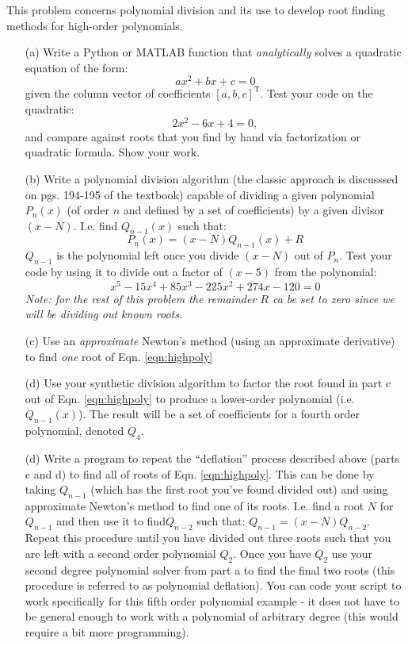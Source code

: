\documentclass{article}
\begin{document}
\begin{enumerate}
  This problem concerns polynomial division and its use to develop root finding methods for high-order polynomials.  
  \begin{itemize}
    \item[(a)]  Write a Python or MATLAB function that \emph{analytically} solves a quadratic equation of the form:
    \begin{equation}
      a x^2 + b x + c = 0 
    \end{equation}
    given the column vector of coefficients $[a, b, c]^\mathsf{T}$.  Test your code on the quadratic:
    \begin{equation}
      2x^2-6x+4=0,
    \end{equation}
    and compare against roots that you find by hand via factorization or quadratic formula.  Show your work.  
    \item[(b)]  Write a polynomial division algorithm (the classic approach is discusssed on pgs. 194-195 of the textbook) capable of dividing a given polynomial $P_n(x)$ (of order $n$ and defined by a set of coefficients) by a given divisor $(x-N)$.  I.e. find $Q_{n-1}(x)$ such that:
    \begin{equation}
      P_n(x) = (x-N) Q_{n-1}(x)+R
    \end{equation}    
    $Q_{n-1}$ is the polynomial left once you divide $(x-N)$ out of $P_n$.  Test your code by using it to divide out a factor of $(x-5)$ from the polynomial:
    \begin{equation}
          x^5-15x^4+85x^3-225x^2+274x-120=0 \label{eqn:highpoly}
    \end{equation}
    \emph{Note:  for the rest of this problem the remainder $R$ ca be set to zero since we will be dividing out known roots.}  
    \item[(c)]  Use an \emph{approximate} Newton's method (using an approximate derivative) to find \emph{one} root of Eqn. \ref{eqn:highpoly}
    \item[(d)]  Use your synthetic division algorithm to factor the root found in part c out of Eqn. \ref{eqn:highpoly} to produce a lower-order polynomial (i.e. $Q_{n-1}(x)$).  The result will be a set of coefficients for a fourth order polynomial, denoted $Q_4$.
    \item[(d)]  Write a program to repeat the ``deflation'' process described above (parts c and d) to find all of roots of Eqn. \ref{eqn:highpoly}.  This can be done by taking $Q_{n-1}$ (which has the first root you've found divided out) and using approximate Newton's method to find one of its roots.  I.e. find a root $N$ for $Q_{n-1}$ and then use it to find$Q_{n-2}$ such that: $Q_{n-1} = (x-N) Q_{n-2}$.  Repeat this procedure until you have divided out three roots such that you are left with a second order polynomial $Q_2$.  Once you have $Q_2$ use your second degree polynomial solver from part a to find the final two roots (this procedure is referred to as polynomial deflation).  You can code your script to work specifically for this fifth order polynomial example - it does not have to be general enough to work with a polynomial of arbitrary degree (this would require a bit more programming).  ~\\~\\

\end{itemize}
\end{enumerate}
\end{document}
